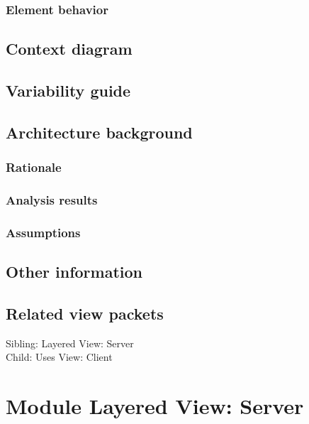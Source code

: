 \documentclass[a4paper,10pt]{article}
\begin{document}
\subsubsection{Element behavior}

\subsection{Context diagram}

\subsection{Variability guide}

\subsection{Architecture background}

\subsubsection{Rationale}

\subsubsection{Analysis results}

\subsubsection{Assumptions}

\subsection{Other information}

\subsection{Related view packets}

Sibling: Layered View: Server\\
Child: Uses View: Client\\


\section{Module Layered View: Server}
\end{document}
